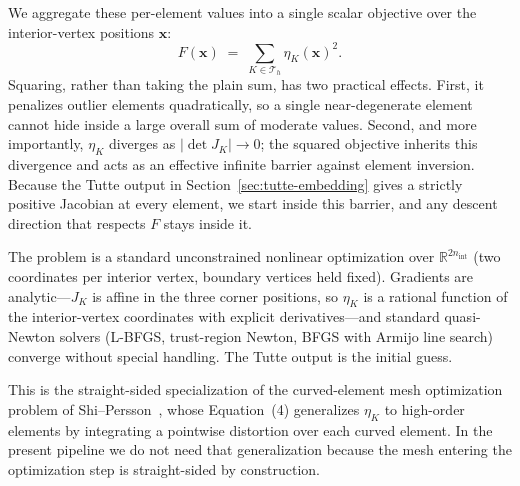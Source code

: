 \documentclass[11pt]{article}
\begin{document}
We aggregate these per-element values into a single scalar
objective over the interior-vertex positions $\mathbf{x}$:
\begin{equation}
  F(\mathbf{x}) \;=\; \sum_{K \in \mathcal{T}_h} \eta_K(\mathbf{x})^2.
  \label{eq:tutte-F}
\end{equation}
Squaring, rather than taking the plain sum, has two practical
effects. First, it penalizes outlier elements quadratically, so a
single near-degenerate element cannot hide inside a large overall
sum of moderate values. Second, and more importantly, $\eta_K$
diverges as $|\det J_K| \to 0$; the squared objective inherits this
divergence and acts as an effective infinite barrier against
element inversion. Because the Tutte output in
Section~\ref{sec:tutte-embedding} gives a strictly positive Jacobian
at every element, we start inside this barrier, and any descent
direction that respects $F$ stays inside it.

The problem is a standard unconstrained nonlinear optimization over
$\mathbb{R}^{2 n_{\mathrm{int}}}$ (two coordinates per interior
vertex, boundary vertices held fixed). Gradients are
analytic---$J_K$ is affine in the three corner positions, so
$\eta_K$ is a rational function of the interior-vertex coordinates
with explicit derivatives---and standard quasi-Newton solvers
(L-BFGS, trust-region Newton, BFGS with Armijo line search) converge
without special handling. The Tutte output is the initial guess.

This is the straight-sided specialization of the curved-element
mesh optimization problem of
Shi--Persson~\cite{shi2023local}, whose Equation~(4) generalizes
$\eta_K$ to high-order elements by integrating a pointwise
distortion over each curved element. In the present pipeline we do
not need that generalization because the mesh entering the
optimization step is straight-sided by construction.


\end{document}
